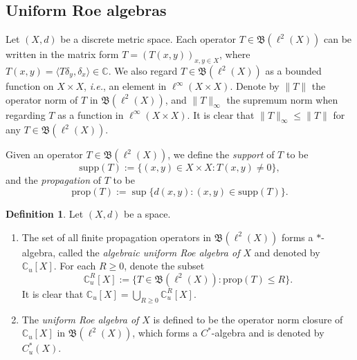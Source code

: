 \documentclass[12pt, a4paper]{amsart}
\numberwithin{equation}{section}
\theoremstyle{definition}
\newtheorem{defn}[thm]{Definition}
\theoremstyle{remark}
\def\CC{\mathbb{C}}
\def\B{\mathfrak{B}}
\def\supp{\mathrm{supp}}
\def\ppg{\mathrm{prop}}
\begin{document}
\subsection{Uniform Roe algebras}\label{ssec:uniform Roe alg}
Let $(X,d)$ be a discrete metric space. Each operator $T \in \B(\ell^2(X))$ can be written in the matrix form $T=(T(x,y))_{x,y\in X}$, where $T(x,y)=\langle T \delta_y, \delta_x \rangle \in \CC$. We also regard $T \in \B(\ell^2(X))$ as a bounded function on $X \times X$, \emph{i.e.}, an element in $\ell^\infty(X \times X)$. 
Denote by $\|T\|$ the operator norm of $T$ in $\B(\ell^2(X))$, and $\|T\|_\infty$ the supremum norm when regarding $T$ as a function in $\ell^\infty(X \times X)$. It is clear that $\|T\|_\infty \leq \|T\|$ for any $T \in \B(\ell^2(X))$.


Given an operator $T \in \B(\ell^2(X))$, we define the \emph{support} of $T$ to be
\[
\supp(T):=\{(x,y) \in X \times X: T(x,y) \neq 0\},
\]
and the \emph{propagation} of $T$ to be 
\[
\ppg(T):= \sup\{d(x,y): (x,y) \in \supp(T)\}.
\]

\begin{defn}\label{defn: unif. Roe alg.}
Let $(X,d)$ be a space. 
\begin{enumerate}
 \item The set of all finite propagation operators in $\B(\ell^2(X))$ forms a $\ast$-algebra, called the \emph{algebraic uniform Roe algebra of $X$} and denoted by $\CC_u[X]$. For each $R\geq 0$, denote the subset 
 \[
 \CC_u^R[X]:=\{T\in \B(\ell^2(X)): \ppg(T) \leq R\}.
 \]
 It is clear that $\CC_u[X]=\bigcup_{R \geq 0} \CC_u^R[X]$.
 \item The \emph{uniform Roe algebra of $X$} is defined to be the operator norm closure of $\CC_u[X]$ in $\B(\ell^2(X))$, which forms a $C^*$-algebra and is denoted by $C^*_u(X)$.
\end{enumerate}
\end{defn}
\end{document}
